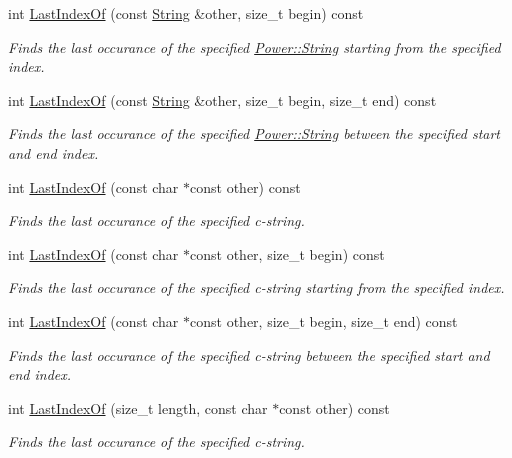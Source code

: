 \begin{DoxyCompactItemize}
int \hyperlink{class_power_1_1_string_a1f885622a6a35b48c3d2be7334c26433}{Last\+Index\+Of} (const \hyperlink{class_power_1_1_string}{String} \&other, size\+\_\+t begin) const
\begin{DoxyCompactList}\small\item\em Finds the last occurance of the specified \hyperlink{class_power_1_1_string}{Power\+::\+String} starting from the specified index. \end{DoxyCompactList}\item 
int \hyperlink{class_power_1_1_string_ac22b55e02887c0087e3f07d22e91b542}{Last\+Index\+Of} (const \hyperlink{class_power_1_1_string}{String} \&other, size\+\_\+t begin, size\+\_\+t end) const
\begin{DoxyCompactList}\small\item\em Finds the last occurance of the specified \hyperlink{class_power_1_1_string}{Power\+::\+String} between the specified start and end index. \end{DoxyCompactList}\item 
int \hyperlink{class_power_1_1_string_ac48efb7e8ad6af8665b08cb2a3804dbc}{Last\+Index\+Of} (const char $\ast$const other) const
\begin{DoxyCompactList}\small\item\em Finds the last occurance of the specified c-\/string. \end{DoxyCompactList}\item 
int \hyperlink{class_power_1_1_string_a60a3c0874cb68c943e5c36192db3be02}{Last\+Index\+Of} (const char $\ast$const other, size\+\_\+t begin) const
\begin{DoxyCompactList}\small\item\em Finds the last occurance of the specified c-\/string starting from the specified index. \end{DoxyCompactList}\item 
int \hyperlink{class_power_1_1_string_afd049df94f7be6b64be4037a770b7b2d}{Last\+Index\+Of} (const char $\ast$const other, size\+\_\+t begin, size\+\_\+t end) const
\begin{DoxyCompactList}\small\item\em Finds the last occurance of the specified c-\/string between the specified start and end index. \end{DoxyCompactList}\item 
int \hyperlink{class_power_1_1_string_a9709f06b80356a5aa4f921f3b29162f1}{Last\+Index\+Of} (size\+\_\+t length, const char $\ast$const other) const
\begin{DoxyCompactList}\small\item\em Finds the last occurance of the specified c-\/string. \end{DoxyCompactList}\item 

\end{DoxyCompactItemize}
